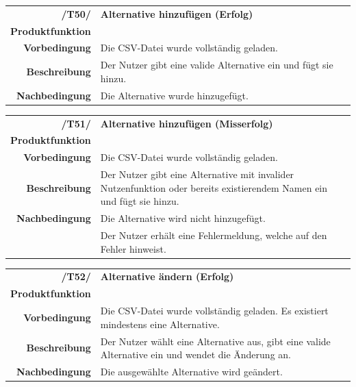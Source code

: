 \documentclass{article}
\begin{document}
\begin{table}[H]
\begin{tabularx}{\textwidth}{rX}
 \vspace{1mm}
\textbf{/T50/}         & \textbf{Alternative hinzufügen (Erfolg)} \\ \vspace{1mm}
\textbf{Produktfunktion} & \nameref{sec:f:Alternative hinzufügen} \\ \vspace{1mm}
\textbf{Vorbedingung}  & Die CSV-Datei wurde vollständig geladen.   \\ \vspace{1mm}
\textbf{Beschreibung}  & Der Nutzer gibt eine valide Alternative ein und fügt sie hinzu. \\
\textbf{Nachbedingung} & Die Alternative wurde hinzugefügt.
\end{tabularx}
\end{table}

\begin{table}[H]
\begin{tabularx}{\textwidth}{rX}
 \vspace{1mm}
\textbf{/T51/}         & \textbf{Alternative hinzufügen (Misserfolg)} \\ \vspace{1mm}
\textbf{Produktfunktion} & \nameref{sec:f:Alternative hinzufügen} \\ \vspace{1mm}
\textbf{Vorbedingung}  & Die CSV-Datei wurde vollständig geladen.   \\ \vspace{1mm}
\textbf{Beschreibung}  & Der Nutzer gibt eine Alternative mit invalider Nutzenfunktion oder bereits existierendem Namen ein und fügt sie hinzu. \\
\textbf{Nachbedingung} & Die Alternative wird nicht hinzugefügt. \\ & Der Nutzer erhält eine Fehlermeldung, welche auf den Fehler hinweist.
\end{tabularx}
\end{table}

\begin{table}[H]
\begin{tabularx}{\textwidth}{rX}
 \vspace{1mm}
\textbf{/T52/}         & \textbf{Alternative ändern (Erfolg)} \\ \vspace{1mm}
\textbf{Produktfunktion} & \nameref{sec:f:Alternative ändern} \\ \vspace{1mm}
\textbf{Vorbedingung}  & Die CSV-Datei wurde vollständig geladen. Es existiert mindestens eine Alternative.  \\ \vspace{1mm}
\textbf{Beschreibung}  & Der Nutzer wählt eine Alternative aus, gibt eine valide Alternative ein und wendet die Änderung an. \\
\textbf{Nachbedingung} & Die ausgewählte Alternative wird geändert.
\end{tabularx}
\end{table}
\end{document}
